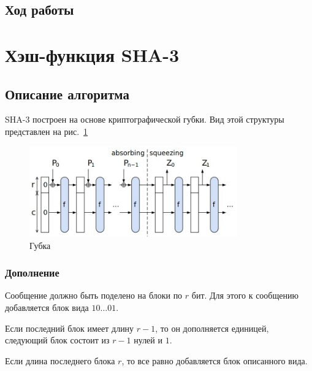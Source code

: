 \documentclass[a4paper, 14pt]{extarticle}
\begin{document}
\subsection{Ход работы}
\lipsum[1] %

\section{Хэш-функция SHA-3}
\subsection{Описание алгоритма}
SHA-3 построен на основе криптографической губки. Вид этой структуры представлен на рис.~\ref{img:sponge}

\begin{figure}[h]
    \centering
    \includegraphics[width=0.8\textwidth]{img/S003.jpg}
    \caption{Губка}%
    \label{img:sponge}
\end{figure}

\FloatBarrier{}
\subsubsection{Дополнение}
Сообщение должно быть поделено на блоки по $r$ бит. Для этого к сообщению добавляется блок вида $10\ldots01$.

Если последний блок имеет длину $r-1$, то он дополняется единицей, следующий блок состоит из $r-1$ нулей и $1$.

Если длина последнего блока $r$, то все равно добавляется блок описанного вида.
\end{document}
